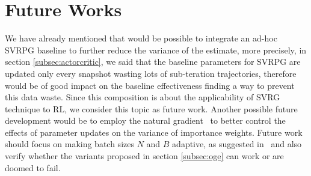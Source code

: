 \section{Future Works}
We have already mentioned that would be possible to integrate an ad-hoc \acs{SVRPG} baseline to further reduce the variance of the estimate, more precisely, in section \ref{subsec:actorcritic}, we said that the baseline parameters for \acs{SVRPG} are updated only every snapshot wasting lots of sub-teration trajectories, therefore would be of good impact on the baseline effectiveness finding a way to prevent this data waste. Since this composition is about the applicability of \acs{SVRG} technique to \acs{RL}, we consider this topic as future work.
Another possible future development would be to employ the natural gradient~\cite{kakade2002natural} to better control the effects of parameter updates on the variance of importance weights. Future work should focus on making batch sizes $N$ and $B$ adaptive, as suggested in~\cite{papini2017adaptive} and also verify whether the variants proposed in section \ref{subsec:oge} can work or are doomed to fail.
\vspace{-0.05in}